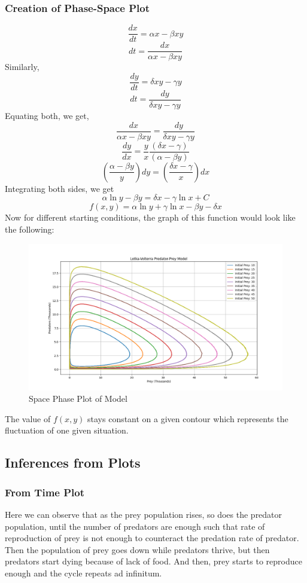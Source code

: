 \documentclass{article}
\begin{document}
\subsubsection{Creation of Phase-Space Plot}
\[\frac{dx}{dt} = \alpha x - \beta xy \]
\[\textit{dt} = \frac{dx}{\alpha x - \beta xy}\]
Similarly,
\[\frac{dy}{dt} = \delta xy - \gamma y \]
\[\textit{dt} = \frac{dy}{\delta xy - \gamma y}\]
Equating both, we get,
\[\frac{dx}{\alpha x - \beta xy} = \frac{dy}{\delta xy - \gamma y}\]
\[\frac{dy}{dx}=\frac{y}{x}\frac{(\delta x-\gamma)}{(\alpha-\beta y)}\]
\[\left(\frac{\alpha - \beta y}{y}\right)\textit{dy} =\left(\frac{\delta x - \gamma}{x}\right)\textit{dx}\]
Integrating both sides, we get 
\[\alpha \ln y - \beta y = \delta x - \gamma \ln x + C\]
\begin{equation}
    f(x,y) = \alpha \ln y + \gamma \ln x - \beta y - \delta x
\end{equation}
Now for different starting conditions, the graph of this function would look like the following:
\begin{figure}[H]
    \centering
    \includegraphics[width=1\linewidth]{Figure_1.png}
    \caption{Space Phase Plot of Model}
    \label{fig:2}
\end{figure}
The value of $f(x,y)$ stays constant on a given contour which represents the fluctuation of one given situation.
\subsection{Inferences from Plots}
\subsubsection{From Time Plot}
Here we can observe that as the prey population rises, so does the predator population, until the number of predators are enough such that rate of reproduction of prey is not enough to counteract the predation rate of predator. Then the population of prey goes down while predators thrive, but then predators start dying because of lack of food. And then, prey starts to reproduce enough and the cycle repeats ad infinitum.
\end{document}
